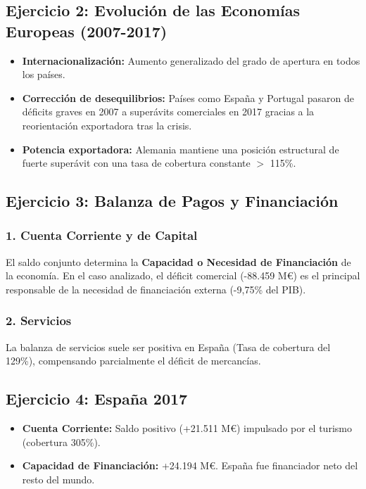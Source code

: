 \subsection{Ejercicio 2: Evolución de las Economías Europeas (2007-2017)}

\begin{itemize}
    \item \textbf{Internacionalización:} Aumento generalizado del grado de apertura en todos los países.
    \item \textbf{Corrección de desequilibrios:} Países como España y Portugal pasaron de déficits graves en 2007 a superávits comerciales en 2017 gracias a la reorientación exportadora tras la crisis.
    \item \textbf{Potencia exportadora:} Alemania mantiene una posición estructural de fuerte superávit con una tasa de cobertura constante $>$ 115\%.
\end{itemize}

\subsection{Ejercicio 3: Balanza de Pagos y Financiación}

\subsubsection{1. Cuenta Corriente y de Capital}
El saldo conjunto determina la \textbf{Capacidad o Necesidad de Financiación} de la economía. En el caso analizado, el déficit comercial (-88.459 M€) es el principal responsable de la necesidad de financiación externa (-9,75\% del PIB).

\subsubsection{2. Servicios}
La balanza de servicios suele ser positiva en España (Tasa de cobertura del 129\%), compensando parcialmente el déficit de mercancías.

\subsection{Ejercicio 4: España 2017}
\begin{itemize}
    \item \textbf{Cuenta Corriente:} Saldo positivo (+21.511 M€) impulsado por el turismo (cobertura 305\%).
    \item \textbf{Capacidad de Financiación:} +24.194 M€. España fue financiador neto del resto del mundo.
\end{itemize}

